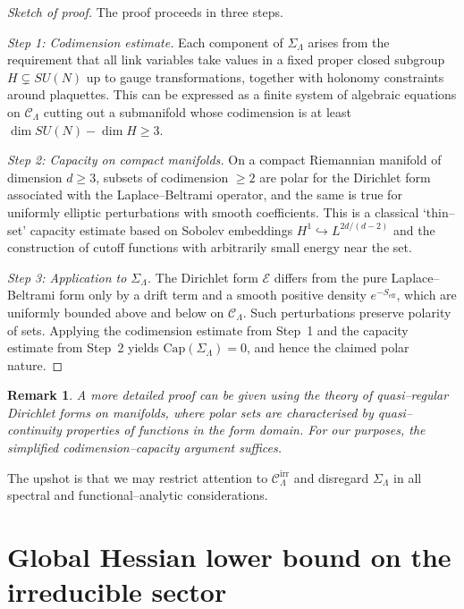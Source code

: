 \documentclass[11pt]{article}
\numberwithin{equation}{section}
\newtheorem{remark}[theorem]{Remark}
\begin{document}
\begin{proof}[Sketch of proof]
The proof proceeds in three steps.

\emph{Step 1: Codimension estimate.}  Each component of $\Sigma_\Lambda$
arises from the requirement that all link variables take values in a
fixed proper closed subgroup $H\subsetneq SU(N)$ up to gauge
transformations, together with holonomy constraints around plaquettes.
This can be expressed as a finite system of algebraic equations on
$\mathcal{C}_\Lambda$ cutting out a submanifold whose codimension is at
least $\dim SU(N) - \dim H \ge 3$.

\emph{Step 2: Capacity on compact manifolds.}  On a compact Riemannian
manifold of dimension $d\ge 3$, subsets of codimension $\ge 2$ are polar
for the Dirichlet form associated with the Laplace--Beltrami operator,
and the same is true for uniformly elliptic perturbations with smooth
coefficients.  This is a classical `thin--set' capacity estimate based
on Sobolev embeddings $H^1\hookrightarrow L^{2d/(d-2)}$ and the
construction of cutoff functions with arbitrarily small energy near the
set.

\emph{Step 3: Application to $\Sigma_\Lambda$.}  The Dirichlet form
$\mathcal{E}$ differs from the pure Laplace--Beltrami form only by a
drift term and a smooth positive density $e^{-S_{\mathrm{eff}}}$, which
are uniformly bounded above and below on $\mathcal{C}_\Lambda$.  Such
perturbations preserve polarity of sets.  Applying the codimension
estimate from Step~1 and the capacity estimate from Step~2 yields
$\mathrm{Cap}(\Sigma_\Lambda)=0$, and hence the claimed polar nature.
\end{proof}

\begin{remark}
A more detailed proof can be given using the theory of quasi--regular
Dirichlet forms on manifolds, where polar sets are characterised by
quasi--continuity properties of functions in the form domain.  For our
purposes, the simplified codimension--capacity argument suffices.
\end{remark}

The upshot is that we may restrict attention to
$\mathcal{C}_\Lambda^{\mathrm{irr}}$ and disregard $\Sigma_\Lambda$ in
all spectral and functional--analytic considerations.

\section{Global Hessian lower bound on the irreducible sector}
\end{document}
